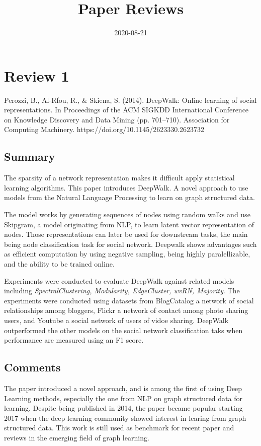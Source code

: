 \documentclass{article}
\begin{document}
\title{Paper Reviews}
\date{2020-08-21}
\maketitle

\section*{Review 1}
Perozzi, B., Al-Rfou, R., \& Skiena, S. (2014). DeepWalk: Online learning 
of social representations. In Proceedings of the ACM SIGKDD International 
Conference on Knowledge Discovery and Data Mining (pp. 701–710). 
Association for Computing Machinery. https://doi.org/10.1145/2623330.2623732

\subsection*{Summary}
The sparsity of a network representation makes it difficult apply statistical
learning algorithms. This paper introduces DeepWalk. A novel approach 
to use models from the Natural Language Processing to learn on graph 
structured data. 

The model works by generating sequences of nodes using random walks and 
use Skipgram, a model originating from NLP, to learn latent vector 
representation of nodes. Those representations can later be used for 
downstream tasks, the main being node classification task for social 
network. Deepwalk shows advantages such as efficient computation by using 
negative sampling, being highly paralellizable, and the ability to be 
trained online. 

Experiments were conducted to evaluate DeepWalk against related models 
including \textit{SpectralClustering, Modularity, EdgeCluster, wvRN, Majority}.
The experiments were conducted using datasets from BlogCatalog a network 
of social relationships among bloggers, Flickr a network of contact among 
photo sharing users, and Youtube a social network of users of vidoe sharing. 
DeepWalk outperformed the other models on the social network classification 
taks when performance are measured using an F1 score. 


\subsection*{Comments}
The paper introduced a novel approach, and is among the first of using 
 Deep Learning methods, especially the one from  NLP on graph structured 
data for learning. Despite being published in 2014, the paper became 
popular starting 2017 when the deep learning community showed interest in 
learing from graph structured data. This work is still used as benchmark 
for recent paper and reviews in the emerging field of graph learning. 
\end{document}
